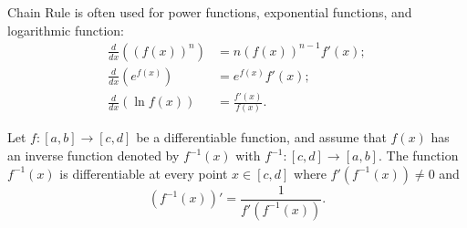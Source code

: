 Chain Rule is often used for power functions, exponential functions, and
    logarithmic function:
\begin{align}
    \frac{d}{dx} ((f(x))^n) &= n (f(x))^{n - 1} f'(x);
        \label{eq:formula:chain-rule:power} \\
    \frac{d}{dx} (e^{f(x)}) &= e^{f(x)} f'(x);
        \label{eq:formula:chain-rule:exp} \\
    \frac{d}{dx} (\ln f(x)) &= \frac{f'(x)}{f(x)}.
        \label{eq:formula:chain-rule:log}
\end{align}

\begin{lemma}
    Let $ f : [a, b] \rightarrow [c, d] $ be a differentiable function, and
        assume that $ f(x) $ has an inverse function denoted by $ f^{-1}(x) $
        with $ f^{-1} : [c, d] \rightarrow [a, b] $.
    The function $ f^{-1}(x) $ is differentiable at every point $ x \in [c, d] $
        where $ f'(f^{-1}(x)) \neq 0 $ and
    \begin{equation}
        (f^{-1}(x))' = \frac{1}{f'(f^{-1}(x))}.
        \label{eq:lemma:inverse}
    \end{equation}
\end{lemma}

